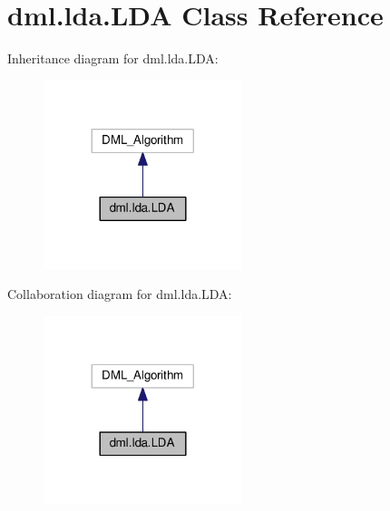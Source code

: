 \hypertarget{classdml_1_1lda_1_1LDA}{}\section{dml.\+lda.\+L\+DA Class Reference}
\label{classdml_1_1lda_1_1LDA}


Inheritance diagram for dml.\+lda.\+L\+DA\+:
\nopagebreak
\begin{figure}[H]
\begin{center}
\leavevmode
\includegraphics[width=164pt]{classdml_1_1lda_1_1LDA__inherit__graph}
\end{center}
\end{figure}


Collaboration diagram for dml.\+lda.\+L\+DA\+:
\nopagebreak
\begin{figure}[H]
\begin{center}
\leavevmode
\includegraphics[width=164pt]{classdml_1_1lda_1_1LDA__coll__graph}
\end{center}
\end{figure}
